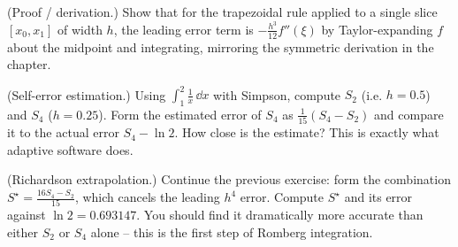 \begin{exercise}
(Proof / derivation.) Show that for the trapezoidal rule applied to a single slice $[x_0, x_1]$ of width $h$, the leading error term is $-\tfrac{h^3}{12}f''(\xi)$ by Taylor-expanding $f$ about the midpoint and integrating, mirroring the symmetric derivation in the chapter.
\end{exercise}

\begin{exercise}
(Self-error estimation.) Using $\int_1^2 \tfrac1x\,\dd x$ with Simpson, compute $S_2$ (i.e. $h = 0.5$) and $S_4$ ($h = 0.25$). Form the estimated error of $S_4$ as $\tfrac{1}{15}(S_4 - S_2)$ and compare it to the actual error $S_4 - \ln 2$. How close is the estimate? This is exactly what adaptive software does.
\end{exercise}

\begin{exercise}
(Richardson extrapolation.) Continue the previous exercise: form the combination $S^\star = \tfrac{16 S_4 - S_2}{15}$, which cancels the leading $h^4$ error. Compute $S^\star$ and its error against $\ln 2 = 0.693147$. You should find it dramatically more accurate than either $S_2$ or $S_4$ alone -- this is the first step of Romberg integration.
\end{exercise}
